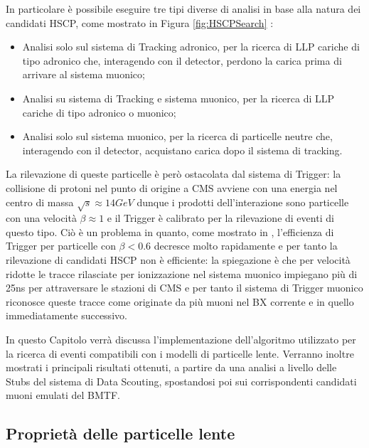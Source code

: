 In particolare è possibile eseguire tre tipi diverse di analisi in base alla natura dei candidati HSCP, come mostrato in Figura \ref{fig:HSCPSearch} \cite{MasterThesisGioMoc}: 
\begin{itemize}
   \item Analisi solo sul sistema di Tracking adronico, per la ricerca di LLP cariche di tipo adronico che, interagendo con il detector, perdono la carica prima di arrivare al sistema muonico;
   \item Analisi su sistema di Tracking e sistema muonico, per la ricerca di LLP cariche di tipo adronico o muonico;
   \item Analisi solo sul sistema muonico, per la ricerca di particelle neutre che, interagendo con il detector, acquistano carica dopo il sistema di tracking.
\end{itemize}

La rilevazione di queste particelle è però ostacolata dal sistema di Trigger: la collisione di protoni nel punto di origine a CMS avviene con una energia nel centro di massa $\sqrt{s} \approx 14 \si{GeV}$ dunque i prodotti dell'interazione sono particelle con una velocità $\beta \approx 1$ e il Trigger è calibrato per la rilevazione di eventi di questo tipo. Ciò è un problema in quanto, come mostrato in \cite{MasterThesisGioMoc}, l'efficienza di Trigger per particelle con $\beta < 0.6$ decresce molto rapidamente e per tanto la rilevazione di candidati HSCP non è efficiente: la spiegazione è che per velocità ridotte le tracce rilasciate per ionizzazione nel sistema muonico impiegano più di 25ns per attraversare le stazioni di CMS e per tanto il sistema di Trigger muonico riconosce queste tracce come originate da più muoni nel BX corrente e in quello immediatamente successivo.

In questo Capitolo verrà discussa l'implementazione dell'algoritmo utilizzato per la ricerca di eventi compatibili con i modelli di particelle lente. Verranno inoltre mostrati i principali risultati ottenuti, a partire da una analisi a livello delle Stubs del sistema di Data Scouting, spostandosi poi sui corrispondenti candidati muoni emulati del BMTF.

\subsection{Proprietà delle particelle lente}

